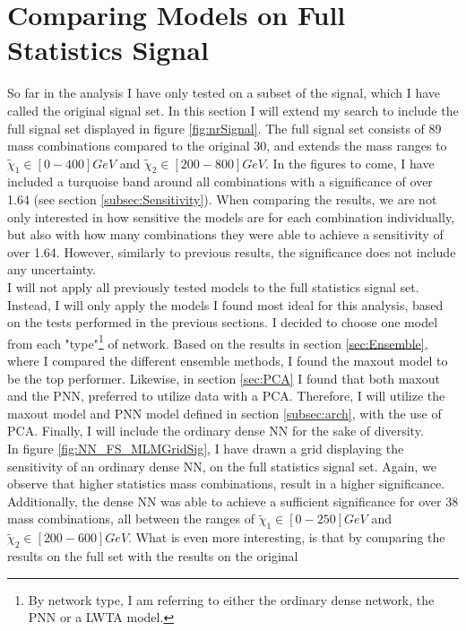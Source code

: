 \section{Comparing Models on Full Statistics Signal}\label{sec:FS}
So far in the analysis I have only tested on a subset of the signal, which I have called the original signal set. In this section 
I will extend my search to include the full signal set displayed in figure \ref{fig:nrSignal}. The full signal set consists of 89 mass 
combinations compared to the original 30, and extends the mass ranges to $\tilde{\chi}_1 \in [0-400]GeV$ and $\tilde{\chi}_2 \in [200-800]GeV$.
In the figures to come, I have included a turquoise band around all combinations with a significance of over 1.64 (see section \ref{subsec:Sensitivity}).
When comparing the results, we are not only interested in how sensitive the models are for each combination individually, but also with how many combinations 
they were able to achieve a sensitivity of over 1.64. However, similarly to previous results, the significance does not include any uncertainty.
\\
I will not apply all previously tested models to the full statistics signal set. Instead, I will only apply the models I found most ideal for this analysis, based 
on the tests performed in the previous sections. I decided to choose one model from each "type"\footnote{By network type, I am referring to either the ordinary dense network, the 
\ac{PNN} or a \ac{LWTA} model. } of network. Based on the results in section \ref{sec:Ensemble}, where I compared the different ensemble methods, I found the maxout model to be 
the top performer. Likewise, in section \ref{sec:PCA} I found that both maxout and the \ac{PNN}, preferred to utilize data with a \ac{PCA}. Therefore, I will utilize the maxout model 
and \ac{PNN} model defined in section \ref{subsec:arch}, with the use of \ac{PCA}. Finally, I will include the ordinary dense \ac{NN} for the sake of diversity.
\\
In figure \ref{fig:NN_FS_MLMGridSig}, I have drawn a grid displaying the sensitivity of an ordinary dense \ac{NN}, on the full statistics signal set. Again, we observe that higher statistics
mass combinations, result in a higher significance. Additionally, the dense \ac{NN} was able to achieve a sufficient significance for over 38 mass combinations, all between the ranges of 
$\tilde{\chi}_1 \in [0-250]GeV$ and $\tilde{\chi}_2 \in [200-600]GeV$. What is even more interesting, is that by comparing the results on the full set with the results on the original 

